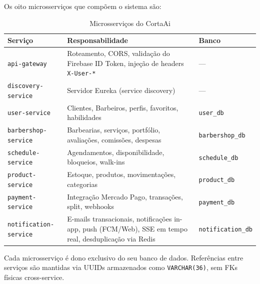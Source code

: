 \documentclass[
    12pt, 
    a4paper, 
    oneside, 
    chapter=TITLE, 
    section=TITLE
]{abntex2}
\begin{document}
Os oito microsserviços que compõem o sistema são:

\begin{table}[htb]
    \centering
    \caption{Microsserviços do CortaAi}
    \label{tab:microservicos}
    \begin{tabular}{p{4cm} p{7.5cm} p{2.5cm}}
        \toprule
        \textbf{Serviço} & \textbf{Responsabilidade} & \textbf{Banco} \\
        \midrule
        \texttt{api-gateway} & Roteamento, CORS, validação do Firebase ID Token, injeção de headers \texttt{X-User-*} & — \\
        \texttt{discovery-service} & Servidor Eureka (service discovery) & — \\
        \texttt{user-service} & Clientes, Barbeiros, perfis, favoritos, habilidades & \texttt{user\_db} \\
        \texttt{barbershop-service} & Barbearias, serviços, portfólio, avaliações, comissões, despesas & \texttt{barbershop\_db} \\
        \texttt{schedule-service} & Agendamentos, disponibilidade, bloqueios, walk-ins & \texttt{schedule\_db} \\
        \texttt{product-service} & Estoque, produtos, movimentações, categorias & \texttt{product\_db} \\
        \texttt{payment-service} & Integração Mercado Pago, transações, split, webhooks & \texttt{payment\_db} \\
        \texttt{notification-service} & E-mails transacionais, notificações in-app, push (FCM/Web), SSE em tempo real, desduplicação via Redis & \texttt{notification\_db} \\
        \bottomrule
    \end{tabular}
\end{table}

Cada microsserviço é dono exclusivo do seu banco de dados. Referências entre serviços são mantidas via UUIDs armazenados como \texttt{VARCHAR(36)}, sem FKs físicas cross-service.
\end{document}
